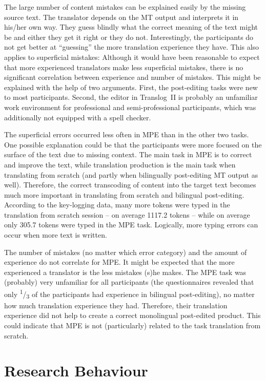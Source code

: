 \documentclass[output=paper]{langsci/langscibook}
\begin{document}
The large number of content mistakes can be explained easily by the missing source text. The translator depends on the MT output and interprets it in his/her own way. They guess blindly what the correct meaning of the text might be and either they get it right or they do not. Interestingly, the participants do not get better at ``guessing'' the more translation experience they have. This also applies to superficial mistakes: Although it would have been reasonable to expect that more experienced translators make less superficial mistakes, there is no significant correlation between experience and number of mistakes. This might be explained with the help of two arguments. First, the post-editing tasks were new to most participants. Second, the editor in Translog~II is probably an unfamiliar work environment for professional and semi-professional participants, which was additionally not equipped with a spell checker.


The superficial errors occurred less often in MPE than in the other two tasks. One possible explanation could be that the participants were more focused on the surface of the text due to missing context. The main task in MPE is to correct and improve the text, while translation production is the main task when translating from scratch (and partly when bilingually post-editing MT output as well). Therefore, the correct transcoding of content into the target text becomes much more important in translating from scratch and bilingual post-editing. According to the key-logging data, many more tokens were typed in the translation from scratch session -- on average 1117.2 tokens -- while on average only 305.7 tokens were typed in the MPE task. Logically, more typing errors can occur when more text is written.



The number of mistakes (no matter which error category) and the amount of experience do not correlate for MPE. It might be expected that the more experienced a translator is the less mistakes (s)he makes. The MPE task was (probably) very unfamiliar for all participants (the questionnaires revealed that only \textsuperscript{1}/\textsubscript{3 }of the participants had experience in bilingual post-editing), no matter how much translation experience they had. Therefore, their translation experience did not help to create a correct monolingual post-edited product. This could indicate that MPE is not (particularly) related to the task translation from scratch.


\section[Research Behaviour]{Research Behaviour\label{nitzke:sec:ResearchBehaviour}}
\end{document}
